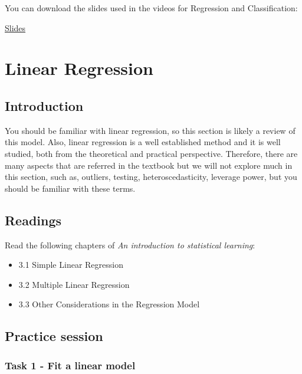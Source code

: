 \documentclass[
]{book}
\providecommand{\tightlist}{%
  \setlength{\itemsep}{0pt}\setlength{\parskip}{0pt}}
\begin{document}
You can download the slides used in the videos for Regression and Classification:

\href{https://www.dropbox.com/s/rg3guxydem4cwsw/Module-2-Regression_classification_2020.pdf?dl=1}{Slides}

\chapter{Linear Regression}\label{linear-regression}

\section{Introduction}\label{LR.intro}

You should be familiar with linear regression, so this section is likely
a review of this model. Also, linear regression is a well established method
and it is well studied, both from the theoretical and practical perspective.
Therefore, there are many aspects that are referred in the textbook but we
will not explore much in this section, such as, outliers, testing,
heteroscedasticity, leverage power, but you should be familiar with these
terms.

\section{Readings}\label{LR.readings}

Read the following chapters of \emph{An introduction to statistical learning}:

\begin{itemize}
\tightlist
\item
  3.1 Simple Linear Regression
\item
  3.2 Multiple Linear Regression
\item
  3.3 Other Considerations in the Regression Model
\end{itemize}

\section{Practice session}\label{LR.practice}

\subsection*{Task 1 - Fit a linear model}\label{task-1---fit-a-linear-model}
\end{document}
